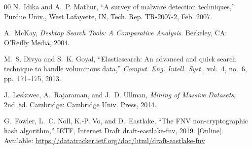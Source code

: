 \documentclass[conference]{IEEEtran}
\begin{document}
\begin{thebibliography}{00}
N.~Idika and A.~P. Mathur, ``A survey of malware detection techniques,'' Purdue Univ., West Lafayette, IN, Tech. Rep. TR-2007-2, Feb. 2007.

A.~McKay, \textit{Desktop Search Tools: A Comparative Analysis}. Berkeley, CA: O'Reilly Media, 2004.

M.~S. Divya and S.~K. Goyal, ``Elasticsearch: An advanced and quick search technique to handle voluminous data,'' \textit{Comput. Eng. Intell. Syst.}, vol.~4, no.~6, pp.~171--175, 2013.

J.~Leskovec, A.~Rajaraman, and J.~D. Ullman, \textit{Mining of Massive Datasets}, 2nd~ed. Cambridge: Cambridge Univ. Press, 2014.

G.~Fowler, L.~C. Noll, K.-P. Vo, and D.~Eastlake, ``The FNV non-cryptographic hash algorithm,'' IETF, Internet Draft draft-eastlake-fnv, 2019. [Online]. Available: \url{https://datatracker.ietf.org/doc/html/draft-eastlake-fnv}

\end{thebibliography}
\end{document}
